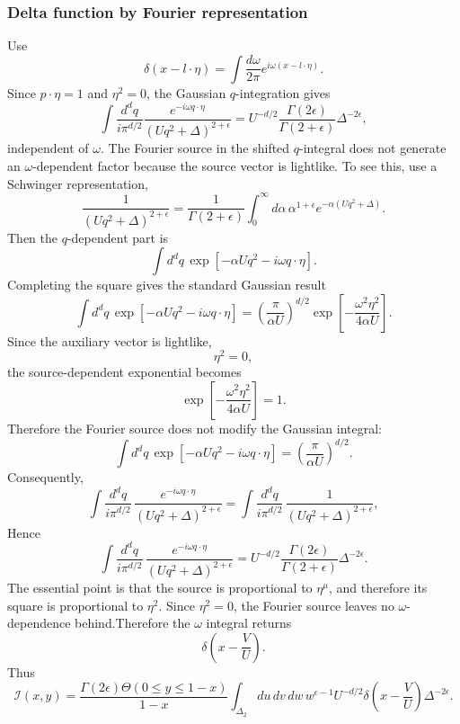 \documentclass[11pt]{article}
\begin{document}
\subsubsection{Delta function by Fourier representation}
Use
\[
\delta(x-l\cdot\eta)=\int\frac{d\omega}{2\pi}e^{i\omega(x-l\cdot\eta)}.
\]
Since $p\cdot\eta=1$ and $\eta^2=0$, the Gaussian $q$-integration gives
\begin{equation}
\int \frac{d^d q}{i\pi^{d/2}}\frac{e^{-i\omega q\cdot\eta}}{(Uq^2+\Delta)^{2+\epsilon}}
=U^{-d/2}\frac{\Gamma(2\epsilon)}{\Gamma(2+\epsilon)}\Delta^{-2\epsilon},
\end{equation}
independent of $\omega$. The Fourier source in the shifted \(q\)-integral does not generate an
\(\omega\)-dependent factor because the source vector is lightlike. To see this,
use a Schwinger representation,
\[
\frac{1}{(Uq^2+\Delta)^{2+\epsilon}}
=
\frac{1}{\Gamma(2+\epsilon)}
\int_0^\infty d\alpha\,
\alpha^{1+\epsilon}
e^{-\alpha(Uq^2+\Delta)} .
\]
Then the \(q\)-dependent part is
\[
\int d^d q\,
\exp\!\left[-\alpha U q^2-i\omega q\cdot\eta\right].
\]
Completing the square gives the standard Gaussian result
\[
\int d^d q\,
\exp\!\left[-\alpha U q^2-i\omega q\cdot\eta\right]
=
\left(\frac{\pi}{\alpha U}\right)^{d/2}
\exp\!\left[-\frac{\omega^2\eta^2}{4\alpha U}\right].
\]
Since the auxiliary vector is lightlike,
\[
\eta^2=0,
\]
the source-dependent exponential becomes
\[
\exp\!\left[-\frac{\omega^2\eta^2}{4\alpha U}\right]=1.
\]
Therefore the Fourier source does not modify the Gaussian integral:
\[
\int d^d q\,
\exp\!\left[-\alpha U q^2-i\omega q\cdot\eta\right]
=
\left(\frac{\pi}{\alpha U}\right)^{d/2}.
\]
Consequently,
\[
\int \frac{d^d q}{i\pi^{d/2}}\,
\frac{e^{-i\omega q\cdot\eta}}
{(Uq^2+\Delta)^{2+\epsilon}}
=
\int \frac{d^d q}{i\pi^{d/2}}\,
\frac{1}
{(Uq^2+\Delta)^{2+\epsilon}},
\]
Hence
\[
\int \frac{d^d q}{i\pi^{d/2}}\,
\frac{e^{-i\omega q\cdot\eta}}
{(Uq^2+\Delta)^{2+\epsilon}}
=
U^{-d/2}
\frac{\Gamma(2\epsilon)}{\Gamma(2+\epsilon)}
\Delta^{-2\epsilon}.
\]
The essential point is that the source is proportional to \(\eta^\mu\), and
therefore its square is proportional to \(\eta^2\). Since \(\eta^2=0\), the
Fourier source leaves no \(\omega\)-dependence behind.Therefore the $\omega$ integral returns
\[
\delta\!\left(x-\frac{V}{U}\right).
\]
Thus
\begin{equation}
\mathcal I(x,y)=
\frac{\Gamma(2\epsilon)\Theta(0\le y\le 1-x)}{1-x}
\int_{\Delta_2}du\,dv\,dw\,w^{\epsilon-1}U^{-d/2}
\delta\!\left(x-\frac{V}{U}\right)
\Delta^{-2\epsilon}.
\end{equation}
\end{document}
